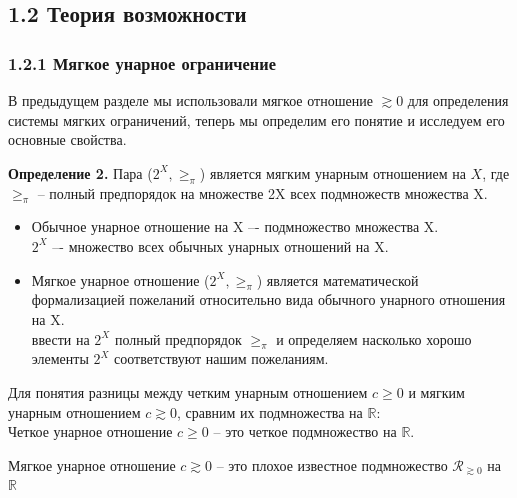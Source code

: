 \documentclass[12pt, a4paper, oneside]{article}
\begin{document}
		\subsection{1.2 Теория возможности}
			\subsubsection{1.2.1 Мягкое унарное ограничение}
				В предыдущем разделе мы использовали мягкое отношение $\gtrsim 0$ для определения системы мягких ограничений, теперь мы определим его понятие и исследуем его основные свойства.
				
				\textbf{Определение 2.} Пара ($2^X,\ge_\pi$) является мягким унарным отношением на $X$, где $\ge_\pi$ -- полный предпорядок на множестве 2X всех подмножеств множества X. \cite{2}
				\begin{itemize}
					\item Обычное унарное отношение на X –- подмножество множества X.\\
						$2^X$ –- множество всех обычных унарных отношений на X.\\
					\item Мягкое унарное отношение ($2^X,\ge_\pi$) является математической формализацией пожеланий относительно вида обычного унарного отношения на X. \\
					ввести на $2^X$ полный предпорядок $\ge_\pi$ и определяем насколько хорошо элементы $2^X$ соответствуют нашим пожеланиям.
				\end{itemize}
				
				Для понятия разницы между четким унарным отношением $c \ge 0$ и мягким унарным отношением $c \gtrsim 0$, сравним их подмножества на $\mathbb{R}$:\\
				Четкое унарное отношение $c \ge 0$ -- это четкое подмножество на $\mathbb{R}$.\\
				
				\begin{center}
				\end{center}
				Мягкое унарное отношение $c \gtrsim 0$ -- это плохое известное подмножество $\mathcal{R}_{\gtrsim0}$ на $\mathbb{R}$\\
				
\end{document}
